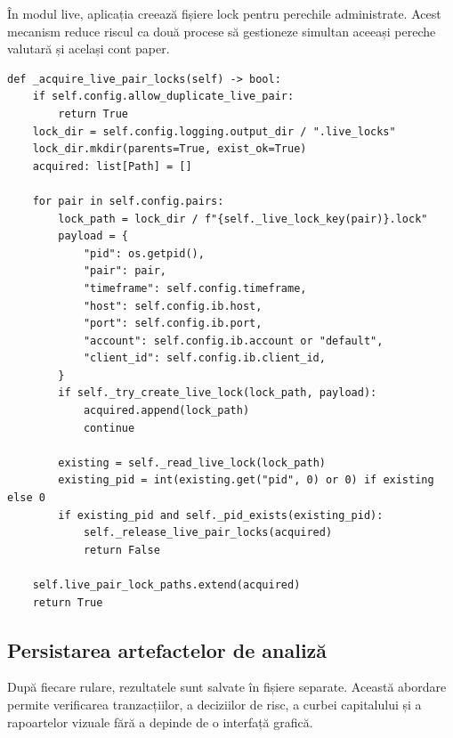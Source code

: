 În modul live, aplicația creează fișiere lock pentru perechile administrate. Acest mecanism reduce riscul ca două procese să gestioneze simultan aceeași pereche valutară și același cont paper.

\begin{code}
\begin{verbatim}
def _acquire_live_pair_locks(self) -> bool:
    if self.config.allow_duplicate_live_pair:
        return True
    lock_dir = self.config.logging.output_dir / ".live_locks"
    lock_dir.mkdir(parents=True, exist_ok=True)
    acquired: list[Path] = []

    for pair in self.config.pairs:
        lock_path = lock_dir / f"{self._live_lock_key(pair)}.lock"
        payload = {
            "pid": os.getpid(),
            "pair": pair,
            "timeframe": self.config.timeframe,
            "host": self.config.ib.host,
            "port": self.config.ib.port,
            "account": self.config.ib.account or "default",
            "client_id": self.config.ib.client_id,
        }
        if self._try_create_live_lock(lock_path, payload):
            acquired.append(lock_path)
            continue

        existing = self._read_live_lock(lock_path)
        existing_pid = int(existing.get("pid", 0) or 0) if existing else 0
        if existing_pid and self._pid_exists(existing_pid):
            self._release_live_pair_locks(acquired)
            return False

    self.live_pair_lock_paths.extend(acquired)
    return True
\end{verbatim}
\caption{Mecanism de lock pentru evitarea rulărilor live duplicate}
\label{code:anexa_live_lock}
\end{code}

\subsection{Persistarea artefactelor de analiză}
\label{anexa:cod_persistare_artefacte}

După fiecare rulare, rezultatele sunt salvate în fișiere separate. Această abordare permite verificarea tranzacțiilor, a deciziilor de risc, a curbei capitalului și a rapoartelor vizuale fără a depinde de o interfață grafică.

